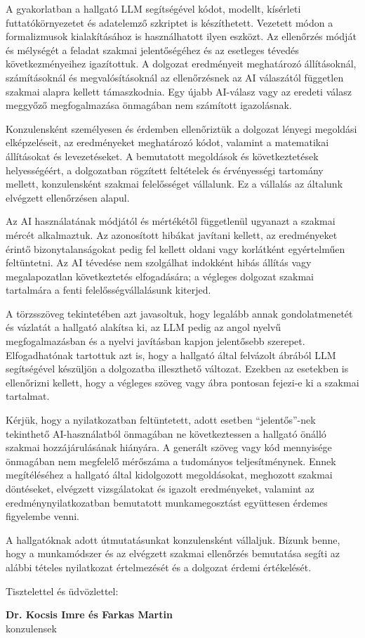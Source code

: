 A gyakorlatban a hallgató LLM segítségével kódot, modellt, kísérleti futtatókörnyezetet és adatelemző szkriptet is készíthetett. Vezetett módon a formalizmusok kialakításához is használhatott ilyen eszközt. Az ellenőrzés módját és mélységét a feladat szakmai jelentőségéhez és az esetleges tévedés következményeihez igazítottuk. A dolgozat eredményeit meghatározó állításoknál, számításoknál és megvalósításoknál az ellenőrzésnek az AI válaszától független szakmai alapra kellett támaszkodnia. Egy újabb AI-válasz vagy az eredeti válasz meggyőző megfogalmazása önmagában nem számított igazolásnak.

Konzulensként személyesen és érdemben ellenőriztük a dolgozat lényegi megoldási elképzeléseit, az eredményeket meghatározó kódot, valamint a matematikai állításokat és levezetéseket. A bemutatott megoldások és következtetések helyességéért, a dolgozatban rögzített feltételek és érvényességi tartomány mellett, konzulensként szakmai felelősséget vállalunk. Ez a vállalás az általunk elvégzett ellenőrzésen alapul.

Az AI használatának módjától és mértékétől függetlenül ugyanazt a szakmai mércét alkalmaztuk. Az azonosított hibákat javítani kellett, az eredményeket érintő bizonytalanságokat pedig fel kellett oldani vagy korlátként egyértelműen feltüntetni. Az AI tévedése nem szolgálhat indokként hibás állítás vagy megalapozatlan következtetés elfogadására; a végleges dolgozat szakmai tartalmára a fenti felelősségvállalásunk kiterjed.

A törzsszöveg tekintetében azt javasoltuk, hogy legalább annak gondolatmenetét és vázlatát a hallgató alakítsa ki, az LLM pedig az angol nyelvű megfogalmazásban és a nyelvi javításban kapjon jelentősebb szerepet. Elfogadhatónak tartottuk azt is, hogy a hallgató által felvázolt ábrából LLM segítségével készüljön a dolgozatba illeszthető változat. Ezekben az esetekben is ellenőrizni kellett, hogy a végleges szöveg vagy ábra pontosan fejezi-e ki a szakmai tartalmat.

Kérjük, hogy a nyilatkozatban feltüntetett, adott esetben \enquote{jelentős}-nek tekinthető AI-használatból önmagában ne következtessen a hallgató önálló szakmai hozzájárulásának hiányára. A generált szöveg vagy kód mennyisége önmagában nem megfelelő mérőszáma a tudományos teljesítménynek. Ennek megítéléséhez a hallgató által kidolgozott megoldásokat, meghozott szakmai döntéseket, elvégzett vizsgálatokat és igazolt eredményeket, valamint az eredménynyilatkozatban bemutatott munkamegosztást együttesen érdemes figyelembe venni.

A hallgatóknak adott útmutatásunkat konzulensként vállaljuk. Bízunk benne, hogy a munkamódszer és az elvégzett szakmai ellenőrzés bemutatása segíti az alábbi tételes nyilatkozat értelmezését és a dolgozat érdemi értékelését.

\medskip
\noindent Tisztelettel és üdvözlettel:

\noindent\textbf{Dr. Kocsis Imre és Farkas Martin}\\
konzulensek
\par
\endgroup
